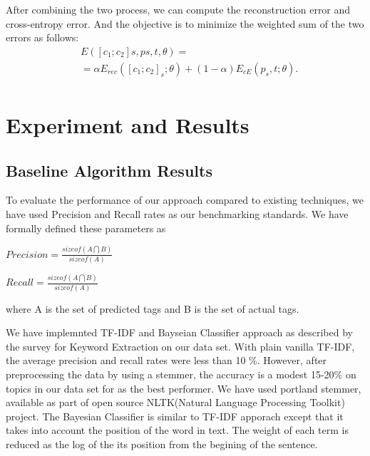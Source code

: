\documentclass[dvips,12pt]{article}
\begin{document}
After combining the two process, we can compute the reconstruction error and cross-entropy error. And the objective is to minimize the weighted sum of the two errors as follows:
\begin{equation}
\begin{split}
 & E([c_{1}; c_{2}]s, ps, t, θ) = \\
 & = \alpha E_{rec}([c_{1}; c_{2}]_{s}; \theta) + (1 - \alpha)E_{cE}(p_{s}, t; \theta).
\\
 \end{split}
\end{equation}
	\section{Experiment and Results}
		\subsection{Baseline Algorithm Results}
		
		To evaluate the performance of our approach compared to existing techniques, we have used Precision and Recall rates as our benchmarking standards.
		We have formally defined these parameters as 
		
		$Precision = \frac{ sizeof(A \bigcap B)}{sizeof(A)}$
		
		$Recall    = \frac{ sizeof(A \bigcap B)}{sizeof(A)}$
		
		where A is the set of predicted tags and B is the set of actual tags.
		
		We have implemnted TF-IDF and Bayseian Classifier approach as described by the survey for Keyword Extraction on our data set. With plain vanilla TF-IDF, the average precision and recall rates were less than 10 \%. However, after preprocessing the data by using a stemmer, the accuracy is a modest 15-20\% on topics in our data set for as the best performer.
		We have used portland stemmer, available as part of open source NLTK(Natural Language Processing Toolkit) project.
		The Bayesian Classifier is similar to TF-IDF apporach except that it takes into account the position of the word in text. The weight of each term is reduced as the log of the its position from the begining of the sentence.
		
\end{document}
